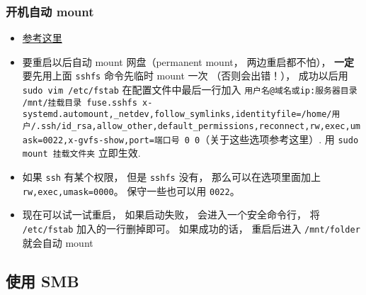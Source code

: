 \subsubsection{开机自动 mount}
\begin{itemize}
\item \href{https://www.linode.com/docs/networking/ssh/using-sshfs-on-linux/}{参考这里}
\item 要重启以后自动 mount 网盘（permanent mount， 两边重启都不怕）， \textbf{一定}要先用上面 \verb`sshfs` 命令先临时 mount 一次 （否则会出错！）， 成功以后用 \verb`sudo vim /etc/fstab` 在配置文件中最后一行加入 \verb`用户名@域名或ip:服务器目录 /mnt/挂载目录 fuse.sshfs x-systemd.automount,_netdev,follow_symlinks,identityfile=/home/用户/.ssh/id_rsa,allow_other,default_permissions,reconnect,rw,exec,umask=0022,x-gvfs-show,port=端口号 0 0`（关于这些选项参考这里）. 用 \verb`sudo mount 挂载文件夹` 立即生效.
\item 如果 \verb`ssh` 有某个权限， 但是 \verb`sshfs` 没有， 那么可以在选项里面加上 \verb`rw,exec,umask=0000`。 保守一些也可以用 \verb`0022`。
\item 现在可以试一试重启， 如果启动失败， 会进入一个安全命令行， 将 \verb`/etc/fstab` 加入的一行删掉即可。 如果成功的话， 重启后进入 \verb`/mnt/folder` 就会自动 mount
\end{itemize}

\subsection{使用 SMB}
